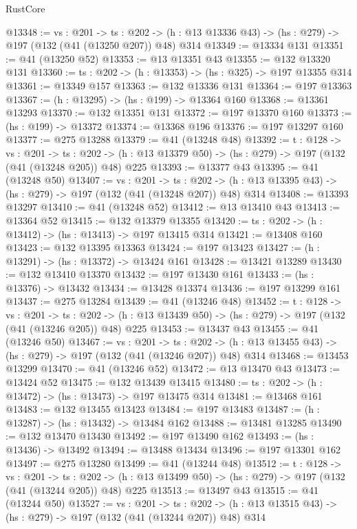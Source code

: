 \begin{lexlean}{RustCore}
\begin{coremodule}
@13348 := {vs : @201} ->
  {ts : @202} -> (h : @13 @13336 @43) -> (hs : @279) -> @197 (@132 (@41 (@13250 @207)) @48) @314
@13349 := @13334 @131
@13351 := @41 (@13250 @52)
@13353 := @13 @13351 @43
@13355 := @132 @13320 @131
@13360 := {ts : @202} -> (h : @13353) -> (hs : @325) -> @197 @13355 @314
@13361 := @13349 @157
@13363 := @132 @13336 @131
@13364 := @197 @13363
@13367 := (h : @13295) -> (hs : @199) -> @13364 @160
@13368 := @13361 @13293
@13370 := @132 @13351 @131
@13372 := @197 @13370 @160
@13373 := (hs : @199) -> @13372
@13374 := @13368 @196
@13376 := @197 @13297 @160
@13377 := @275 @13288
@13379 := @41 (@13248 @48)
@13392 := {t : @128} ->
  {vs : @201} ->
  {ts : @202} -> (h : @13 @13379 @50) -> (hs : @279) -> @197 (@132 (@41 (@13248 @205)) @48) @225
@13393 := @13377 @43
@13395 := @41 (@13248 @50)
@13407 := {vs : @201} ->
  {ts : @202} -> (h : @13 @13395 @43) -> (hs : @279) -> @197 (@132 (@41 (@13248 @207)) @48) @314
@13408 := @13393 @13297
@13410 := @41 (@13248 @52)
@13412 := @13 @13410 @43
@13413 := @13364 @52
@13415 := @132 @13379 @13355
@13420 := {ts : @202} -> (h : @13412) -> (hs : @13413) -> @197 @13415 @314
@13421 := @13408 @160
@13423 := @132 @13395 @13363
@13424 := @197 @13423
@13427 := (h : @13291) -> (hs : @13372) -> @13424 @161
@13428 := @13421 @13289
@13430 := @132 @13410 @13370
@13432 := @197 @13430 @161
@13433 := (hs : @13376) -> @13432
@13434 := @13428 @13374
@13436 := @197 @13299 @161
@13437 := @275 @13284
@13439 := @41 (@13246 @48)
@13452 := {t : @128} ->
  {vs : @201} ->
  {ts : @202} -> (h : @13 @13439 @50) -> (hs : @279) -> @197 (@132 (@41 (@13246 @205)) @48) @225
@13453 := @13437 @43
@13455 := @41 (@13246 @50)
@13467 := {vs : @201} ->
  {ts : @202} -> (h : @13 @13455 @43) -> (hs : @279) -> @197 (@132 (@41 (@13246 @207)) @48) @314
@13468 := @13453 @13299
@13470 := @41 (@13246 @52)
@13472 := @13 @13470 @43
@13473 := @13424 @52
@13475 := @132 @13439 @13415
@13480 := {ts : @202} -> (h : @13472) -> (hs : @13473) -> @197 @13475 @314
@13481 := @13468 @161
@13483 := @132 @13455 @13423
@13484 := @197 @13483
@13487 := (h : @13287) -> (hs : @13432) -> @13484 @162
@13488 := @13481 @13285
@13490 := @132 @13470 @13430
@13492 := @197 @13490 @162
@13493 := (hs : @13436) -> @13492
@13494 := @13488 @13434
@13496 := @197 @13301 @162
@13497 := @275 @13280
@13499 := @41 (@13244 @48)
@13512 := {t : @128} ->
  {vs : @201} ->
  {ts : @202} -> (h : @13 @13499 @50) -> (hs : @279) -> @197 (@132 (@41 (@13244 @205)) @48) @225
@13513 := @13497 @43
@13515 := @41 (@13244 @50)
@13527 := {vs : @201} ->
  {ts : @202} -> (h : @13 @13515 @43) -> (hs : @279) -> @197 (@132 (@41 (@13244 @207)) @48) @314

\end{coremodule}
\end{lexlean}
